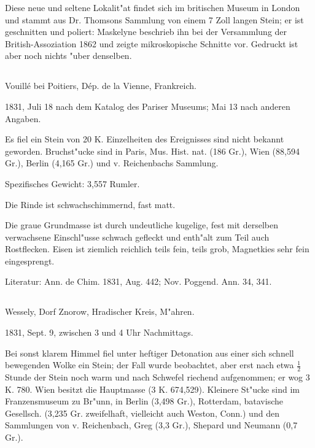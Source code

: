 \documentclass[a4paper, 11pt, oneside]{article}
\begin{document}
Diese neue und seltene Lokalit"at findet sich im britischen Museum in London und stammt aus Dr. Thomsons Sammlung von einem 7 Zoll langen Stein; er ist geschnitten und poliert: Maskelyne beschrieb ihn bei der Versammlung der British-Assoziation 1862 und zeigte mikroskopische Schnitte vor. Gedruckt ist aber noch nichts "uber denselben.

\subsection{}
\LARGE
\paragraph{}
Vouillé bei Poitiers, Dép. de la Vienne, Frankreich.

1831, Juli 18 nach dem Katalog des Pariser Museums; Mai 13 nach anderen Angaben.

Es fiel ein Stein von 20 K. Einzelheiten des Ereignisses sind nicht bekannt geworden. Bruchst"ucke sind in Paris, Mus. Hist. nat. (186 Gr.), Wien (88,594 Gr.), Berlin (4,165 Gr.) und v. Reichenbachs Sammlung.

Spezifisches Gewicht: 3,557 Rumler.

Die Rinde ist schwachschimmernd, fast matt.

Die graue Grundmasse ist durch undeutliche kugelige, fest mit derselben verwachsene Einschl"usse schwach gefleckt und enth"alt zum Teil auch Rostflecken. Eisen ist ziemlich reichlich teils fein, teils grob, Magnetkies sehr fein eingesprengt.

\normalsize
Literatur: Ann. de Chim. 1831, Aug. 442; Nov. Poggend. Ann. 34, 341.

\subsection{}
\LARGE
\paragraph{}
Wessely, Dorf Znorow, Hradischer Kreis, M"ahren.

1831, Sept. 9, zwischen 3 und 4 Uhr Nachmittags.

Bei sonst klarem Himmel fiel unter heftiger Detonation aus einer sich schnell bewegenden Wolke ein Stein; der Fall wurde beobachtet, aber erst nach etwa $\mathfrak{\frac{1}{2}}$ Stunde der Stein noch warm und nach Schwefel riechend aufgenommen; er wog 3 K. 780. Wien besitzt die Hauptmasse (3 K. 674,529). Kleinere St"ucke sind im Franzensmuseum zu Br"unn, in Berlin (3,498 Gr.), Rotterdam, batavische Gesellsch. (3,235 Gr. zweifelhaft, vielleicht auch Weston, Conn.) und den Sammlungen von v. Reichenbach, Greg (3,3 Gr.), Shepard und Neumann (0,7 Gr.).
\end{document}
